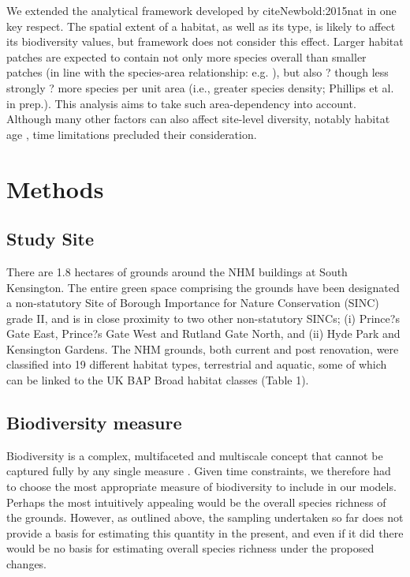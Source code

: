 We extended the analytical framework developed by cite{Newbold:2015nat} in one key respect. The spatial extent of a habitat, as well as its type, is likely to affect its biodiversity values, but \cite{Newbold:2015nat} framework does not consider this effect.  Larger habitat patches are expected to contain not only more species overall than smaller patches (in line with the species-area relationship: e.g. \citealt{rosenzweig:1995species}), but also ? though less strongly ? more species per unit area (i.e., greater species density; Phillips et al. in prep.). This analysis aims to take such area-dependency into account. Although many other factors can also affect site-level diversity, notably habitat age \citep{Sattler:2010le}, time limitations precluded their consideration.


\section{Methods}
\subsection{Study Site}
There are 1.8 hectares of grounds around the NHM buildings at South Kensington. The entire green space comprising the grounds have been designated a non-statutory Site of Borough Importance for Nature Conservation (SINC) grade II, and is in close proximity to two other non-statutory SINCs; (i) Prince?s Gate East, Prince?s Gate West and Rutland Gate North, and (ii) Hyde Park and Kensington Gardens. The NHM grounds, both current and post renovation, were classified into 19 different habitat types, terrestrial and aquatic, some of which can be linked to the UK BAP Broad habitat classes (Table 1).

\subsection{Biodiversity measure}
Biodiversity is a complex, multifaceted and multiscale concept that cannot be captured fully by any single measure \citep{Purvis:2000nat}. Given time constraints, we therefore had to choose the most appropriate measure of biodiversity to include in our models. Perhaps the most intuitively appealing would be the overall species richness of the grounds. However, as outlined above, the sampling undertaken so far does not provide a basis for estimating this quantity in the present, and even if it did there would be no basis for estimating overall species richness under the proposed changes.

